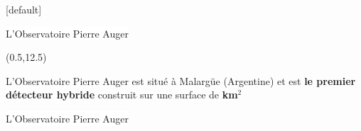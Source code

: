 \documentclass[t, compress]{beamer}
\begin{document}
{

[default]

\begin{frame}[c, fragile]{\colorbox{white}{L'Observatoire Pierre Auger}}

  \begin{textblock}{5}(0.5,12.5)
    \begin{beamerboxesrounded}[upper=lbtuc,lower=lbtuc,shadow=false]
      {}\vspace{-0.1cm}
      \begin{center}
        \scriptsize L'Observatoire Pierre Auger est situé à Malargüe
        (Argentine) et est \textbf{le premier détecteur hybride} construit
        sur une surface de \textbf{\unit[3000]{km$^2$}}
      \end{center}
    \end{beamerboxesrounded}
  \end{textblock}

\end{frame}

\begin{frame}[c, fragile]{\colorbox{white}{L'Observatoire Pierre Auger}}


\end{frame}}
\end{document}
